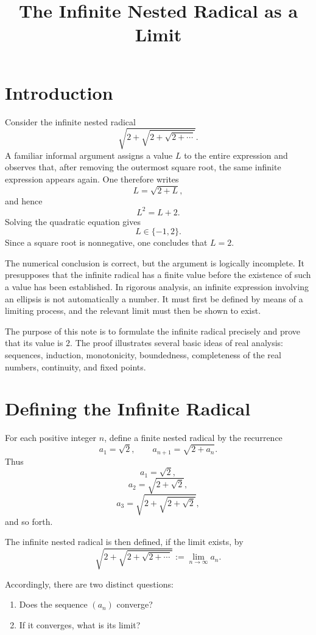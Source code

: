 \documentclass{essay}
\title{The Infinite Nested Radical as a Limit}
\author{}
\date{}
\begin{document}
\maketitle

\section{Introduction}

Consider the infinite nested radical
\[ \sqrt{2+\sqrt{2+\sqrt{2+\cdots}}}. \]
A familiar informal argument assigns a value \(L\) to the entire expression and observes that, after removing the outermost square root, the same infinite expression appears again. One therefore writes
\[ L=\sqrt{2+L}, \]
and hence
\[ L^{2}=L+2. \]
Solving the quadratic equation gives
\[ L\in\{-1,2\}. \]
Since a square root is nonnegative, one concludes that \(L=2\).

The numerical conclusion is correct, but the argument is logically incomplete. It presupposes that the infinite radical has a finite value before the existence of such a value has been established. In rigorous analysis, an infinite expression involving an ellipsis is not automatically a number. It must first be defined by means of a limiting process, and the relevant limit must then be shown to exist.

The purpose of this note is to formulate the infinite radical precisely and prove that its value is \(2\). The proof illustrates several basic ideas of real analysis: sequences, induction, monotonicity, boundedness, completeness of the real numbers, continuity, and fixed points.

\section{Defining the Infinite Radical}

For each positive integer \(n\), define a finite nested radical by the recurrence
\[ a_{1}=\sqrt{2}, \qquad a_{n+1}=\sqrt{2+a_{n}}. \]
Thus
\[ a_{1}=\sqrt{2}, \]
\[ a_{2}=\sqrt{2+\sqrt{2}}, \]
\[ a_{3}=\sqrt{2+\sqrt{2+\sqrt{2}}}, \]
and so forth.

The infinite nested radical is then defined, if the limit exists, by
\[ \sqrt{2+\sqrt{2+\sqrt{2+\cdots}}} := \lim_{n\to\infty} a_{n}. \]

Accordingly, there are two distinct questions:

\begin{enumerate}
  \item Does the sequence \((a_{n})\) converge?
  \item If it converges, what is its limit?
\end{enumerate}
\end{document}
